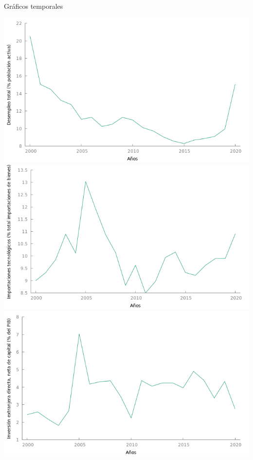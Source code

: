 \begin{table}[!htbp] \centering 
  \caption{Gráficos temporales} 
  \label{} 
\begin{multicols}{2}
\includegraphics[scale=.33]{r/econometria2/image/desempleo.png}\\
\includegraphics[scale=.33]{r/econometria2/image/TIC.png}\\
\includegraphics[scale=.33]{r/econometria2/image/I.png}\\

\end{multicols}
\end{table}
